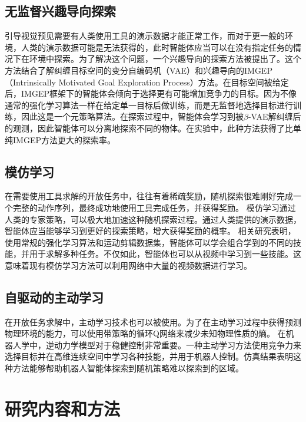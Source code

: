         \subsection{无监督兴趣导向探索}
        引导视觉预见需要有人类使用工具的演示数据才能正常工作，而对于更一般的环境，人类的演示数据可能是无法获得的，此时智能体应当可以在没有指定任务的情况下在环境中探索。为了解决这个问题，一个兴趣导向的探索方法被提出了\cite{laversanne-finot2018curiosity, 刘一鸣2020}。这个方法结合了解纠缠目标空间的变分自编码机（VAE）\cite{conf/nips/PuGHYLSC16}和兴趣导向的IMGEP（Intrinsically Motivated Goal Exploration Process）方法\cite{DBLP:journals/corr/abs-1708-02190}。在目标空间被给定后，IMGEP框架下的智能体会倾向于选择更有可能增加竞争力的目标。因为不像通常的强化学习算法一样在给定单一目标后做训练，而是无监督地选择目标进行训练，因此这是一个元策略算法。在探索过程中，智能体会学习到被$\beta$-VAE解纠缠后的观测，因此智能体可以分离地探索不同的物体。在实验中，此种方法获得了比单纯IMGEP方法更大的探索率。

        \subsection{模仿学习}
        在需要使用工具求解的开放任务中，往往有着稀疏奖励，随机探索很难刚好完成一个完整的动作序列，最终成功地使用工具完成任务，并获得奖励。
        模仿学习通过人类的专家策略，可以极大地加速这种随机探索过程。通过人类提供的演示数据，智能体应当能够学习到更好的探索策略，增大获得奖励的概率。
        相关研究表明，使用常规的强化学习算法和运动剪辑数据集，智能体可以学会组合学到的不同的技能，并用于求解多种任务\cite{peng2018deepmimic}。不仅如此，智能体也可以从视频中学习到一些技能\cite{peng2019sfv}。这意味着现有模仿学习方法可以利用网络中大量的视频数据进行学习。

        \subsection{自驱动的主动学习}
        在开放任务求解中，主动学习技术也可以被使用\cite{conf/icml/EpshteynVD08,conf/nips/HoE16,conf/nips/DuanASHSSAZ17}。为了在主动学习过程中获得预测物理环境的能力，可以使用带策略的循环Q网络来减少未知物理性质的熵\cite{li2019active}。
        在机器人学中，逆动力学模型对于稳健控制非常重要。一种主动学习方法使用竞争力来选择目标并在高维连续空间中学习各种技能，并用于机器人控制\cite{baranes2013active}。仿真结果表明这种方法能够帮助机器人智能体探索到随机策略难以探索到的区域。

    \section{研究内容和方法}

